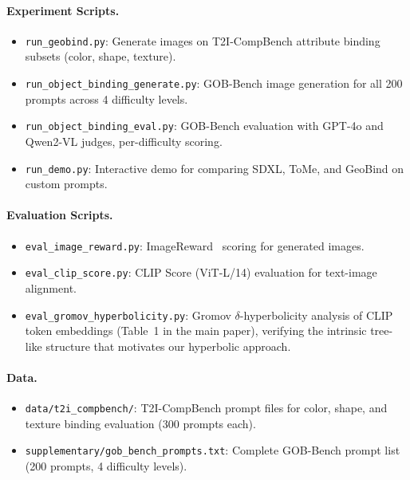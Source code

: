 \documentclass[sigconf,nonacm]{acmart}
\begin{document}
\paragraph{Experiment Scripts.}
\begin{itemize}
\item \texttt{run\_geobind.py}: Generate images on T2I-CompBench attribute binding subsets (color, shape, texture).
\item \texttt{run\_object\_binding\_generate.py}: GOB-Bench image generation for all 200 prompts across 4 difficulty levels.
\item \texttt{run\_object\_binding\_eval.py}: GOB-Bench evaluation with GPT-4o and Qwen2-VL judges, per-difficulty scoring.
\item \texttt{run\_demo.py}: Interactive demo for comparing SDXL, ToMe, and GeoBind on custom prompts.
\end{itemize}

\paragraph{Evaluation Scripts.}
\begin{itemize}
\item \texttt{eval\_image\_reward.py}: ImageReward~\cite{xu2024imagereward} scoring for generated images.
\item \texttt{eval\_clip\_score.py}: CLIP Score (ViT-L/14) evaluation for text-image alignment.
\item \texttt{eval\_gromov\_hyperbolicity.py}: Gromov $\delta$-hyperbolicity analysis of CLIP token embeddings (Table~1 in the main paper), verifying the intrinsic tree-like structure that motivates our hyperbolic approach.
\end{itemize}

\paragraph{Data.}
\begin{itemize}
\item \texttt{data/t2i\_compbench/}: T2I-CompBench prompt files for color, shape, and texture binding evaluation (300 prompts each).
\item \texttt{supplementary/gob\_bench\_prompts.txt}: Complete GOB-Bench prompt list (200 prompts, 4 difficulty levels).
\end{itemize}
\end{document}

